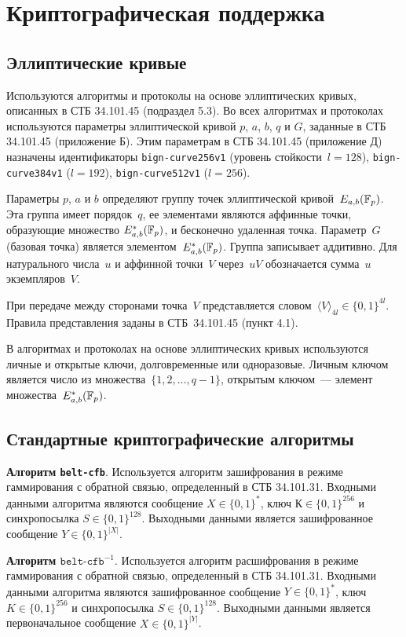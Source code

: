 \chapter{Криптографическая поддержка}\label{CRYPTO}

\section{Эллиптические кривые}

Используются алгоритмы и протоколы 
на основе эллиптических кривых, описанных в СТБ 34.101.45 (подраздел 5.3). Во 
всех алгоритмах и протоколах используются параметры эллиптической кривой 
$p$, $a$, $b$, $q$ и $G$, заданные в СТБ 34.101.45 (приложение Б).
Этим параметрам в СТБ 34.101.45 (приложение Д) назначены идентификаторы
\texttt{bign-curve256v1} (уровень стойкости~$l=128$), 
\texttt{bign-curve384v1} ($l=192$), \texttt{bign-curve512v1} ($l=256$).

Параметры $p$, $a$ и $b$ определяют группу точек эллиптической
кривой~$E_{a,b}({\mathbb F}_p)$. Эта группа имеет порядок~$q$, ее элементами
являются аффинные точки, образующие множество $E_{a,b}^*({\mathbb F}_p)$, и
бесконечно удаленная точка. Параметр~$G$ (базовая точка) является
элементом~$E_{a,b}^*({\mathbb F}_p)$. Группа записывает аддитивно. Для натурального
числа~$u$ и аффинной точки~$V$ через~$uV$ обозначается сумма~$u$
экземпляров~$V$.

При передаче между сторонами точка~$V$ представляется 
словом~$\langle V\rangle_{4l}\in\{0,1\}^{4l}$. Правила представления заданы 
в СТБ~34.101.45 (пункт 4.1).

В алгоритмах и протоколах на основе эллиптических кривых используются 
личные и открытые ключи, долговременные или одноразовые. Личным ключом 
является число из множества~$\{1, 2,\ldots, q-1\}$, открытым ключом~--- 
элемент множества~$E_{a,b}^*({\mathbb F}_p)$.

\section{Стандартные криптографические алгоритмы}
\label{CRYPTO.StdAlg}

{\bf Алгоритм \texttt{belt-cfb}}.
Используется алгоритм зашифрования в режиме 
гаммирования с обратной связью, определенный в СТБ 34.101.31. 
Входными данными алгоритма являются сообщение $X\in\{0,1\}^*$, 
ключ $К\in\{0,1\}^{256}$ и синхропосылка $S\in\{0,1\}^{128}$.
Выходными данными является зашифрованное сообщение $Y\in\{0,1\}^{|X|}$.

{\bf Алгоритм $\texttt{belt-cfb}^{-1}$}.
Используется алгоритм расшифрования в режиме 
гаммирования с обратной связью, определенный в СТБ 34.101.31. 
Входными данными алгоритма являются зашифрованное 
сообщение $Y\in\{0,1\}^*$, ключ $K\in\{0,1\}^{256}$ 
и синхропосылка $S\in\{0,1\}^{128}$. Выходными 
данными является первоначальное сообщение $X\in\{0,1\}^{|Y|}$.

